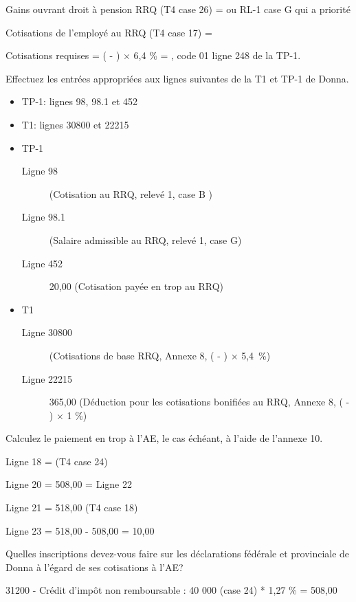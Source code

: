 Gains ouvrant droit à pension RRQ (T4 case 26) =  ou RL-1 case G qui a priorité

Cotisations de l’employé au RRQ (T4 case 17) = 

Cotisations requises = ( - ) $\times$ 6,4 \% = , code 01 ligne 248 de la TP-1.

\begin{question}
	Effectuez les entrées appropriées aux lignes suivantes de la T1 et TP-1 de Donna.
	\begin{itemize}
		\item TP-1: lignes 98, 98.1 et 452 
		\item T1: lignes 30800 et 22215
	\end{itemize}
\end{question}
\begin{itemize}
	\item TP-1
	\begin{description}
		\item[Ligne 98]  (Cotisation au RRQ, relevé 1, case B )
		\item[Ligne 98.1]  (Salaire admissible au RRQ, relevé 1, case G)
		\item[Ligne 452] 20,00 (Cotisation payée en trop au RRQ)
	\end{description}
	\item T1
	\begin{description}
		\item[Ligne 30800]  (Cotisations de base RRQ, Annexe 8, ( -  ) $\times$ 5,4~\%)
		\item[Ligne 22215] 365,00 (Déduction pour les cotisations bonifiées au RRQ, Annexe 8, ( -  ) $\times$ 1 \%)
	\end{description}
\end{itemize}

\begin{question}
	Calculez le paiement en trop à l'AE, le cas échéant, à l'aide de l'annexe 10.
\end{question}
Ligne 18 =  (T4 case 24)

Ligne 20 = 508,00 = Ligne 22

Ligne 21 =  518,00 (T4 case 18)

Ligne 23 = 518,00 - 508,00 = 10,00

\begin{question}
	Quelles inscriptions devez-vous faire sur les déclarations fédérale et provinciale de Donna à l'égard de ses cotisations à l'AE?
\end{question}
31200 - Crédit d'impôt non remboursable : 40 000 (case 24) * 1,27 \% = 508,00

